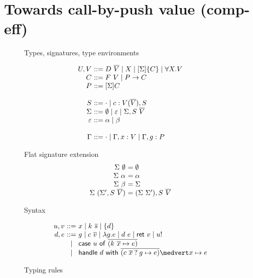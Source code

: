 \documentclass[preprint]{sigplanconf}
\newcommand{\many}{\overline}
\newcommand{\sig}{S}
\newcommand{\sigs}{\Sigma}
\newcommand{\effbox}[1]{[#1]}
\newcommand{\keyword}[1]{\mathsf{#1}}
\newcommand{\handleSymbol}{\mathbin{?}}
\newcommand{\handle}[2]{{#1} \handleSymbol {#2}}
\newcommand{\thunk}[1]{\{{#1}\}}
\newcommand{\force}[1]{{#1}!}
\begin{document}
\section{Towards call-by-push value (comp-eff)}

\begin{figure*}

Types, signatures, type environments

\[
\begin{array}{@{}r@{~}l@{}}
U, V &::= D~\many{V} \mid X \mid \effbox{\sigs}\thunk{C} \mid \forall X.V \\
C    &::= F~V \mid P \to C \\
P    &::= \effbox{\sigs}C \\
\\
\sig  &::= \cdot \mid c : V(\many{V}), \sig \\
\sigs &::=
  \emptyset \mid \varepsilon \mid \sigs, \sig~\many{V} \\
\varepsilon &::= \alpha \mid \beta \\
\\
\Gamma &::= \cdot \mid \Gamma, x:V \mid \Gamma, g:P \\
\end{array}
\]

Flat signature extension
\[
\begin{array}{@{}r@{~}l@{}}
\sigs~\emptyset &= \emptyset \\
\sigs~\alpha &= \alpha \\
\sigs~\beta &= \sigs \\
\sigs~(\sigs', \sig~\many{V}) &= (\sigs~\sigs'), \sig~\many{V} \\
\end{array}
\]

Syntax

\[
\begin{array}{@{}r@{~}c@{~}l@{}}
u, v &::=& x \mid k~\many{s} \mid \thunk{d} \\  %
d, e &::=& g \mid c~\many{v}                     %
   \mid \lambda g.e \mid d~e \mid \keyword{ret}~v \mid \force{u} \\
  &\mid& \keyword{case}~u~\keyword{of}~
           \many{(k~\many{x} \mapsto e)} \\
  &\mid& \keyword{handle} ~d~ \keyword{with}~
           \many{(\handle{c~\many{x}}{g} \mapsto e)} \medvert
            x        \mapsto e \\
\end{array}
\]

Typing rules
\medskip


\end{figure*}
\end{document}
